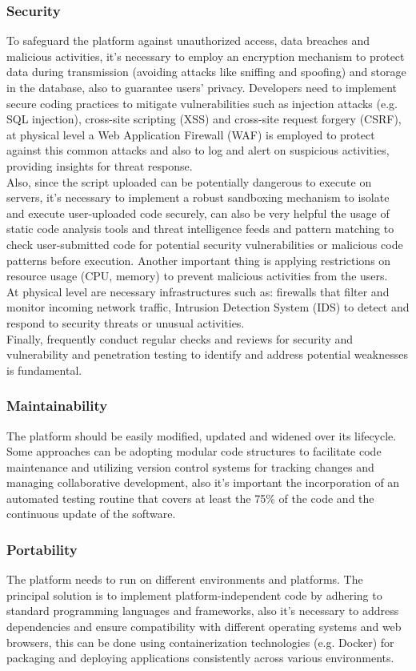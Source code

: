 \subsubsection{Security}
To safeguard the platform against unauthorized access, data breaches and malicious activities, it’s necessary to employ an encryption mechanism to protect data during transmission (avoiding attacks like sniffing and spoofing) and storage in the database, also to guarantee users’ privacy. Developers need to implement secure coding practices to mitigate vulnerabilities such as injection attacks (e.g. SQL injection), cross-site scripting (XSS) and cross-site request forgery (CSRF), at physical level a Web Application Firewall (WAF) is employed to protect against this common attacks and also to log and alert on suspicious activities, providing insights for threat response. \\
Also, since the script uploaded can be potentially dangerous to execute on servers, it’s necessary to implement a robust sandboxing mechanism to isolate and execute user-uploaded code securely, can also be very helpful the usage of static code analysis tools and threat intelligence feeds and pattern matching to check user-submitted code for potential security vulnerabilities or malicious code patterns before execution. Another important thing is applying restrictions on resource usage (CPU, memory) to prevent malicious activities from the users. \\
At physical level are necessary infrastructures such as: firewalls that filter and monitor incoming network traffic, Intrusion Detection System (IDS) to detect and respond to security threats or unusual activities. \\
Finally, frequently conduct regular checks and reviews for security and vulnerability and penetration testing to identify and address potential weaknesses is fundamental.

\subsubsection{Maintainability}
The platform should be easily modified, updated and widened over its lifecycle. Some approaches can be adopting modular code structures to facilitate code maintenance and utilizing version control systems for tracking changes and managing collaborative development, also it’s important the incorporation of an automated testing routine that covers at least the 75\% of the code and the continuous update of the software.

\subsubsection{Portability}
The platform needs to run on different environments and platforms. The principal solution is to implement platform-independent code by adhering to standard programming languages and frameworks, also it’s necessary to address dependencies and ensure compatibility with different operating systems and web browsers, this can be done using containerization technologies (e.g. Docker) for packaging and deploying applications consistently across various environments.